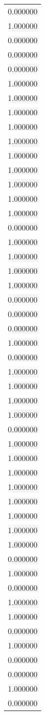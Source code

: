 \begin{tabular}{r}
\toprule
\midrule
0.000000 \\
1.000000 \\
0.000000 \\
0.000000 \\
0.000000 \\
1.000000 \\
1.000000 \\
1.000000 \\
1.000000 \\
1.000000 \\
1.000000 \\
1.000000 \\
1.000000 \\
1.000000 \\
1.000000 \\
0.000000 \\
1.000000 \\
1.000000 \\
1.000000 \\
1.000000 \\
0.000000 \\
0.000000 \\
0.000000 \\
1.000000 \\
0.000000 \\
1.000000 \\
1.000000 \\
1.000000 \\
1.000000 \\
0.000000 \\
1.000000 \\
1.000000 \\
1.000000 \\
1.000000 \\
1.000000 \\
1.000000 \\
1.000000 \\
1.000000 \\
0.000000 \\
1.000000 \\
0.000000 \\
1.000000 \\
1.000000 \\
0.000000 \\
1.000000 \\
0.000000 \\
0.000000 \\
1.000000 \\
0.000000 \\

\end{tabular}
